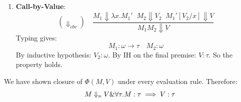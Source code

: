 \begin{solution}
\begin{enumerate}
Now by (\textbf{Lemma 5.3.2}):
\[M_2:\omega \implies M_1'[M_2/x]:\tau\]
By IH on the second premise: $V:\tau$.
So the property holds.
\item \textbf{Call-by-Value}:
\[(\Downarrow_{cbv})\quad \frac{M_1 \Downarrow \lambda x.M_1'\; \; M_2\Downarrow V_2\; \;   M_1'[V_2/x]\Downarrow V}{M_1M_2 \Downarrow V} \]
Typing gives: \[M_1: \omega \to \tau \quad M_2:\omega\]
By inductive hypothesis: $V_2:\omega$.
By IH on the final premise: $V:\tau$.
So the property holds.
\end{enumerate}
We have shown closure of $\Phi(M,V)$ under every evaluation rule.
Therefore: 
\[M \Downarrow_n V \& \forall \tau.M : \tau \implies V : \tau\]
\end{solution}
